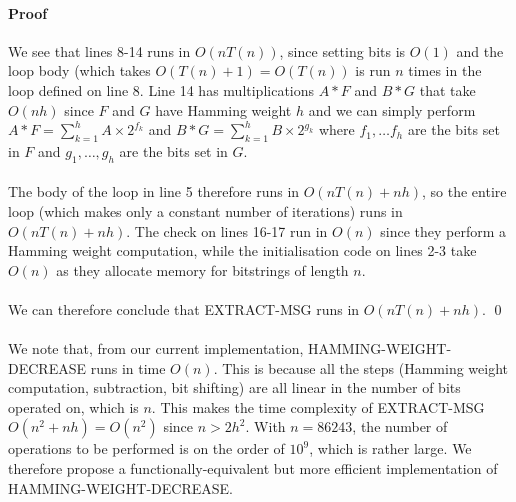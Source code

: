 \paragraph{\textbf{Proof}}
We see that lines 8-14 runs in $O(n T(n))$, since setting bits is $O(1)$ and the loop body (which takes $O(T(n) + 1) = O(T(n))$ is run $n$ times in the loop defined on line 8. Line 14 has multiplications $A*F$ and $B*G$ that take $O(nh)$ since $F$ and $G$ have Hamming weight $h$ and we can simply perform $A*F = \sum_{k = 1}^h A \times 2^{f_k}$ and $B*G = \sum_{k = 1}^h B \times 2^{g_k}$ where $f_1, \dots f_h$ are the bits set in $F$ and $g_1, \dots, g_h$ are the bits set in $G$.

\paragraph{}
The body of the loop in line 5 therefore runs in $O(nT(n) + nh)$, so the entire loop (which makes only a constant number of iterations) runs in $O(nT(n) + nh)$. The check on lines 16-17 run in $O(n)$ since they perform a Hamming weight computation, while the initialisation code on lines 2-3 take $O(n)$ as they allocate memory for bitstrings of length $n$.

\paragraph{}
We can therefore conclude that EXTRACT-MSG runs in $O(nT(n) + nh)$. \qed

\paragraph{}
We note that, from our current implementation, HAMMING-WEIGHT-DECREASE runs in time $O(n)$. This is because all the steps (Hamming weight computation, subtraction, bit shifting) are all linear in the number of bits operated on, which is $n$. This makes the time complexity of EXTRACT-MSG $O(n^2 + nh) = O(n^2)$ since $n > 2 h^2$. With $n = 86243$, the number of operations to be performed is on the order of $10^9$, which is rather large. We therefore propose a functionally-equivalent but more efficient implementation of HAMMING-WEIGHT-DECREASE.

